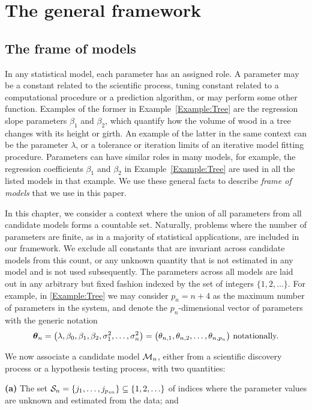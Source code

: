\section{The general framework}
\label{Section:FrameOfModels}

\subsection{The frame of models}
In any statistical model, each parameter has an assigned role. A parameter may be a constant related to the scientific process, tuning constant related to a computational procedure or a prediction algorithm, or may perform some other function. Examples of the former in Example~\ref{Example:Tree} are the regression slope
parameters $\beta_{1}$ and $\beta_{2}$, which quantify how the volume of wood in a tree changes with its height or girth. An example of the latter in the same context can be the parameter $\lambda$, or a tolerance or iteration limits of an iterative model fitting procedure. Parameters can have  similar roles in many models, for example, the regression coefficients $\beta_{1}$ and $\beta_{2}$  in Example~\ref{Example:Tree} are used in all the listed models in that example. We use these general facts to describe {\it frame of models} that we use in this paper. 

In this chapter, we consider a context where the union of all parameters from all candidate models forms a countable set. Naturally, problems where the number of parameters are finite, as in a majority of statistical applications, are included in our framework. We exclude all constants that are invariant across candidate models from this count, or any unknown quantity that is not estimated in any model and 
is not used subsequently. The parameters across all models are laid out in any arbitrary but fixed fashion
indexed by the set of integers $\{ 1, 2, \ldots   \}$. For example, in \ref{Example:Tree} we may consider  $ p_n  = n + 4$ as the maximum number of parameters in the system, and denote the $ p_n $-dimensional vector of parameters  with the generic notation
%
$$
{\boldsymbol{\theta}}_{n} = \bigl( \lambda, \beta_{0}, \beta_{1}, \beta_{2}, \sigma_{1}^{2}, \ldots, \sigma_{n}^{2}
\bigr) =
\bigl( \theta_{n,1} , \theta_{n,2} ,  \ldots, 
\theta_{n,p_n} \bigr)
\text{ notationally.}
$$
%

We now associate a candidate model ${\cal{M}}_n$, either from a scientific discovery process or a hypothesis 
testing process, with two quantities:

\vspace{1em}
\noindent\textbf{(a)} The set ${\cal{S}}_{n} = \{ j_{1}, \ldots, j_{ p_{s n}}\} \subseteq \{1, 2, \ldots  \}$ 
of indices where the parameter values are unknown and estimated from the data; and

